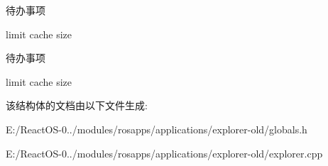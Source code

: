 \begin{DoxyRefDesc}{待办事项}
\item[\hyperlink{todo__todo000021}{待办事项}]limit cache size \end{DoxyRefDesc}


\begin{DoxyRefDesc}{待办事项}
\item[\hyperlink{todo__todo000022}{待办事项}]limit cache size \end{DoxyRefDesc}


该结构体的文档由以下文件生成\+:\begin{DoxyCompactItemize}
\item 
E\+:/\+React\+O\+S-\/0../modules/rosapps/applications/explorer-\/old/globals.\+h\item 
E\+:/\+React\+O\+S-\/0../modules/rosapps/applications/explorer-\/old/explorer.\+cpp\end{DoxyCompactItemize}
